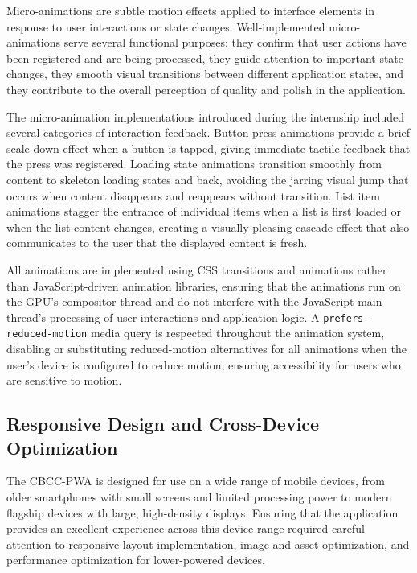Micro-animations are subtle motion effects applied to interface elements in response to user interactions or state changes. Well-implemented micro-animations serve several functional purposes: they confirm that user actions have been registered and are being processed, they guide attention to important state changes, they smooth visual transitions between different application states, and they contribute to the overall perception of quality and polish in the application.

The micro-animation implementations introduced during the internship included several categories of interaction feedback. Button press animations provide a brief scale-down effect when a button is tapped, giving immediate tactile feedback that the press was registered. Loading state animations transition smoothly from content to skeleton loading states and back, avoiding the jarring visual jump that occurs when content disappears and reappears without transition. List item animations stagger the entrance of individual items when a list is first loaded or when the list content changes, creating a visually pleasing cascade effect that also communicates to the user that the displayed content is fresh.

All animations are implemented using CSS transitions and animations rather than JavaScript-driven animation libraries, ensuring that the animations run on the GPU's compositor thread and do not interfere with the JavaScript main thread's processing of user interactions and application logic. A \texttt{prefers-reduced-motion} media query is respected throughout the animation system, disabling or substituting reduced-motion alternatives for all animations when the user's device is configured to reduce motion, ensuring accessibility for users who are sensitive to motion.

\subsection{Responsive Design and Cross-Device Optimization}

The CBCC-PWA is designed for use on a wide range of mobile devices, from older smartphones with small screens and limited processing power to modern flagship devices with large, high-density displays. Ensuring that the application provides an excellent experience across this device range required careful attention to responsive layout implementation, image and asset optimization, and performance optimization for lower-powered devices.

